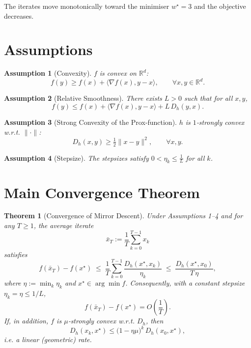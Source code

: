 \documentclass{article}
\newtheorem{theorem}{Theorem}
\newtheorem{assumption}{Assumption}
\newcommand{\Breg}{D_{h}}
\newcommand{\inner}[2]{\langle #1,#2\rangle}
\begin{document}
The iterates move monotonically toward the minimiser $w^{\star}=3$ and the objective decreases.

\newpage
\section*{Assumptions}
\begin{assumption}[Convexity]
$f$ is convex on $^{d}$:
\[
f(y)\ge f(x)+\inner{\nabla f(x)}{y-x},\qquad\forall x,y\in\mathbb{R}^{d}.
\]
\end{assumption}
\begin{assumption}[Relative Smoothness]
There exists $L>0$ such that for all $x,y$,
\[
f(y)\le f(x)+\inner{\nabla f(x)}{y-x}+L\,\Breg(y,x).
\]
\end{assumption}
\begin{assumption}[Strong Convexity of the Prox‑function]
$h$ is $1$‑strongly convex w.r.t. $\|\cdot\|$:
\[
\Breg(x,y)\ge \tfrac12\|x-y\|^{2},\qquad\forall x,y.
\]
\end{assumption}
\begin{assumption}[Stepsize]
The stepsizes satisfy $0<\eta_k\le {}$ for all $k$.
\end{assumption}

\section*{Main Convergence Theorem}
\begin{theorem}[Convergence of Mirror Descent]\label{thm:md}
Under Assumptions 1–4 and for any $T$, the average iterate
\[
\bar x_T:=\frac{1}{T}\sum_{k=0}^{T-1}x_k
\]
satisfies
\[
f(\bar x_T)-f(x^{\star})\;\le\;\frac{1}{T}\sum_{k=0}^{T-1}\frac{\Breg(x^{\star},x_k)}{\eta_k}
\;\le\;\frac{\Breg(x^{\star},x_0)}{T\,\eta},
\]
where $\eta:=\min_k\eta_k$ and $x^{\star}\in\arg\min f$.
Consequently, with a constant stepsize $\eta_k=\eta{}/L$,
\[
f(\bar x_T)-f(x^{\star})=O\!\left(\frac{1}{T}\right).
\]
If, in addition, $f$ is $\mu$‑strongly convex w.r.t. $\Breg$, then
\[
\Breg(x_{k},x^{\star})\le \bigl(1-\eta\mu\bigr)^{k}\,\Breg(x_0,x^{\star}),
\]
i.e. a linear (geometric) rate.
\end{theorem}
\end{document}
